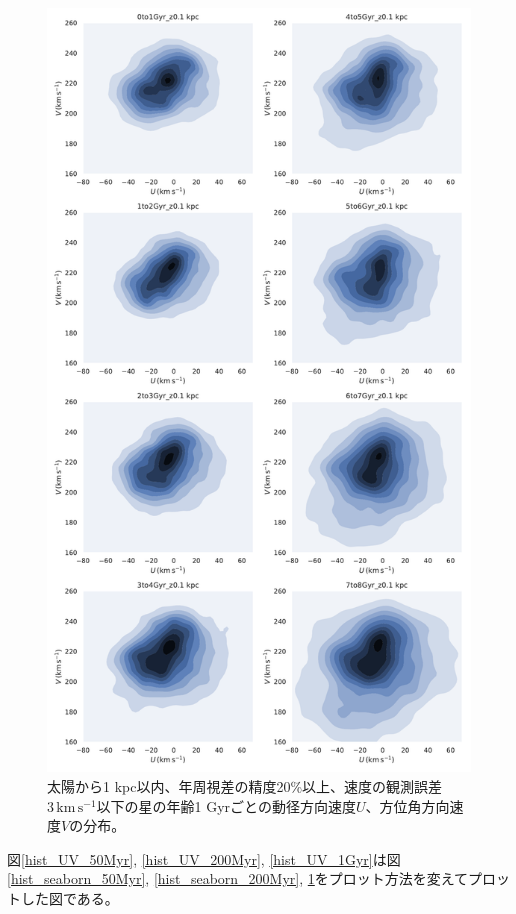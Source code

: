 \begin{figure}[htbp]
\begin{center}
	\includegraphics[width=12cm]{fig/UV/hist_seaborn_0_z0.1kpc.pdf}
	\caption{太陽から1 kpc以内、年周視差の精度20\%以上、速度の観測誤差$3\,\mathrm{km\,s^{-1}}$以下の星の年齢1 Gyrごとの動径方向速度$U$、方位角方向速度$V$の分布。}
	\label{hist_seaborn_1Gyr}
\end{center}
\end{figure}

図\ref{hist_UV_50Myr}, \ref{hist_UV_200Myr}, \ref{hist_UV_1Gyr}は図\ref{hist_seaborn_50Myr}, \ref{hist_seaborn_200Myr}, \ref{hist_seaborn_1Gyr}をプロット方法を変えてプロットした図である。

